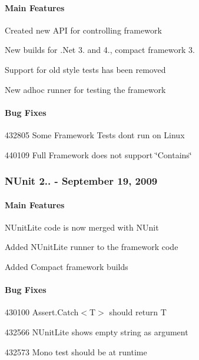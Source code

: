 \paragraph*{Main Features}


\begin{DoxyItemize}
\item Created new A\+PI for controlling framework
\item New builds for .Net 3. and 4., compact framework 3.
\item Support for old style tests has been removed
\item New adhoc runner for testing the framework
\end{DoxyItemize}

\paragraph*{Bug Fixes}


\begin{DoxyItemize}
\item 432805 Some Framework Tests don\textquotesingle{}t run on Linux
\item 440109 Full Framework does not support \char`\"{}\+Contains\char`\"{}
\end{DoxyItemize}

\subsubsection*{N\+Unit 2.. -\/ September 19, 2009}

\paragraph*{Main Features}


\begin{DoxyItemize}
\item N\+Unit\+Lite code is now merged with N\+Unit
\item Added N\+Unit\+Lite runner to the framework code
\item Added Compact framework builds
\end{DoxyItemize}

\paragraph*{Bug Fixes}


\begin{DoxyItemize}
\item 430100 {\ttfamily Assert.\+Catch$<$T$>$} should return T
\item 432566 N\+Unit\+Lite shows empty string as argument
\item 432573 Mono test should be at runtime
\end{DoxyItemize}

